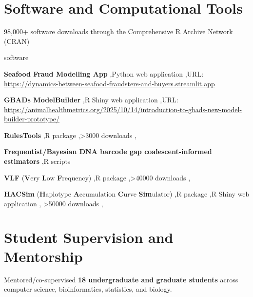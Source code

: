 \section{Software and Computational Tools}
98,000+ software downloads through the Comprehensive R Archive Network (CRAN)

\medskip
\begin{revlist}[itemsep=0.2\baselineskip]{software}
\item \textbf{Seafood Fraud Modelling App} \sep Python web application \sep URL: \url{https://dynamics-between-seafood-fraudsters-and-buyers.streamlit.app}
\item \textbf{GBADs ModelBuilder} \sep R Shiny web application \sep URL: \url{https://animalhealthmetrics.org/2025/10/14/introduction-to-gbads-new-model-builder-prototype/}
\item \textbf{RulesTools} \sep R package \sep >3000 downloads \sep
\item \textbf{Frequentist/Bayesian DNA barcode gap coalescent-informed estimators}
  \sep R scripts
\item \textbf{VLF} (\textbf{V}ery \textbf{L}ow \textbf{F}requency) \sep R package
  \sep >40000 downloads \sep {}
\item \textbf{HACSim} (\textbf{H}aplotype \textbf{A}ccumulation \textbf{C}urve
  \textbf{Sim}ulator) \sep R package \sep R Shiny web application \sep
  >50000 downloads \sep {}
\end{revlist}

\section{Student Supervision and Mentorship}
Mentored/co-supervised \textbf{18 undergraduate and graduate students} across
computer science, bioinformatics, statistics, and biology.

\medskip
\legenddirect
\legendco


